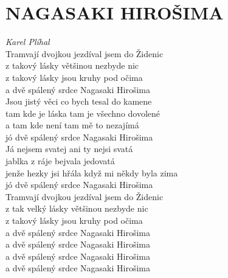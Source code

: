 \section*{\Huge NAGASAKI HIROŠIMA}
\emph{Karel Plíhal}\\

Tramvají dvojkou jezdíval jsem do Židenic\\
z takový lásky většinou nezbyde nic\\
z takový lásky jsou kruhy pod očima\\
a dvě spálený srdce Nagasaki Hirošima\\

Jsou jistý věci co bych tesal do kamene\\
tam kde je láska tam je všechno dovolené\\
a tam kde není tam mě to nezajímá\\
jó dvě spálený srdce Nagasaki Hirošima\\

Já nejsem svatej ani ty nejsi svatá\\
jablka z ráje bejvala jedovatá\\
jenže hezky jsi hřála když mi někdy byla zima\\
jó dvě spálený srdce Nagasaki Hirošima\\

Tramvají dvojkou jezdíval jsem do Židenic\\
z tak velký lásky většinou nezbyde nic\\
z takový lásky jsou kruhy pod očima\\
a dvě spálený srdce Nagasaki Hirošima\\
a dvě spálený srdce Nagasaki Hirošima\\
a dvě spálený srdce Nagasaki Hirošima\\
a dvě spálený srdce Nagasaki Hirošima

\newpage
